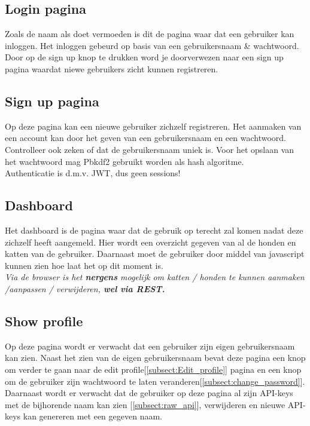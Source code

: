 \documentclass{article}
\begin{document}
\subsection{Login pagina} 
\label{subsect:login_pagina}
Zoals de naam als doet vermoeden is dit de pagina waar dat een gebruiker kan inloggen. Het inloggen gebeurd op basis van een gebruikersnaam \& wachtwoord. Door op de sign up knop te drukken word je doorverwezen naar een sign up pagina waardat niewe gebruikers zicht kunnen registreren. 

\subsection{Sign up pagina}
Op deze pagina kan een nieuwe gebruiker zichzelf registreren. Het aanmaken van een account kan door het geven van een gebruikersnaam en een wachtwoord. Controlleer ook zeken of dat de gebruikersnaam uniek is. Voor het opslaan van het wachtwoord mag Pbkdf2 gebruikt worden als hash algoritme. \\

Authenticatie is d.m.v. JWT, dus geen sessions!

\subsection{Dashboard} 
\label{subsect:home_page}
Het dashboard is de pagina waar dat de gebruik op terecht zal komen nadat deze zichzelf heeft aangemeld. Hier wordt een overzicht gegeven van al de honden en katten van de gebruiker. Daarnaast moet de gebruiker door middel van javascript kunnen zien hoe laat het op dit moment is. \\

\textit{Via de browser is het \textbf{nergens} mogelijk om katten / honden te kunnen aanmaken /aanpassen / verwijderen, \textbf{wel via REST.}}

\subsection{Show profile}
\label{subsect:show_profile}
Op deze pagina wordt er verwacht dat een gebruiker zijn eigen gebruikersnaam kan zien. Naast het zien van de eigen gebruikersnaam bevat deze pagina een knop om verder te gaan naar de edit profile[\ref{subsect:Edit_profile}] pagina en een knop om de gebruiker zijn wachtwoord te laten veranderen[\ref{subsect:change_password}]. \\

Daarnaast wordt er verwacht dat de gebruiker op deze pagina al zijn API-keys met de bijhorende naam kan zien [\ref{subsect:raw_api}], verwijderen en nieuwe API-keys kan genereren met een gegeven naam.
\end{document}
